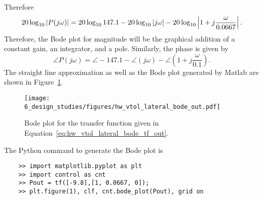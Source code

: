 Therefore
\[
20\log_{10}\left|P(j\omega)\right|=
	20\log_{10} 147.1 
	-20\log_{10}\left|j\omega\right|
	-20\log_{10}\left|1+j\frac{\omega}{0.0667}\right|.
\]
Therefore, the Bode plot for magnitude will be the graphical addition of a constant gain, an integrator, and a pole.
Similarly, the phase is given by
\[
\angle P(j\omega) = 
	\angle -147.1
	- \angle (j\omega)
	- \angle (1+j\frac{\omega}{0.1}).
\]
The straight line approximation as well as the Bode plot generated by Matlab are shown in Figure~\ref{fig:hw_vtol_lateral_bode_out}.
\begin{figure}[H]
   \centering
   \texttt{[image: 6\_design\_studies/figures/hw\_vtol\_lateral\_bode\_out.pdf]}
   \caption{Bode plot for the transfer function given in Equation~\eqref{eq:hw_vtol_lateral_bode_tf_out}.}
   \label{fig:hw_vtol_lateral_bode_out}
\end{figure}

The Python command to generate the Bode plot is
\begin{lstlisting}
	>> import matplotlib.pyplot as plt
	>> import control as cnt
	>> Pout = tf([-9.8],[1, 0.0667, 0]);
	>> plt.figure(1), clf, cnt.bode_plot(Pout), grid on
\end{lstlisting}

